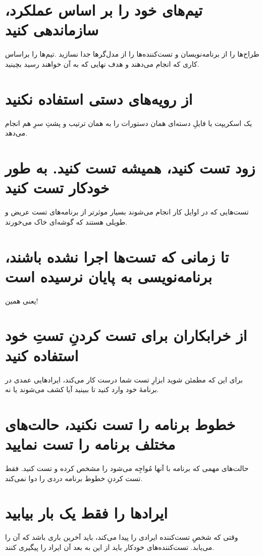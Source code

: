 \documentclass[10pt, a4paper]{book}
\begin{document}
    \section{تیم‌های خود را بر اساس عملکرد، سازماندهی کنید}
    طراح‌ها را از برنامه‌نویسان و تست‌کننده‌ها را از مدل‌گر‌ها جدا نسازید .تیم‌ها را براساس کاری که انجام می‌دهند و هدف نهایی که به آن خواهند رسید بچینید.

    \section{از رویه‌های دستی استفاده نکنید}
    یک اسکریپت یا فایلِ دسته‌ای همان دستورات را به همان ترتیب و پشتِ سرِ هم انجام می‌دهد.

    \section{زود تست کنید، همیشه تست کنید. به طور خودکار تست کنید}
    تست‌هایی که در اوایل کار انجام می‌شوند بسیار موثرتر از برنامه‌های تست عریض و طویلی هستند که گوشه‌ای خاک می‌خورند.

    \section{تا زمانی که تست‌ها اجرا نشده باشند، برنامه‌نویسی به پایان نرسیده است}
    یعنی همین!

    \section{از خرابکاران برای تست کردنِ تستِ خود استفاده کنید}
    برای این که مطمئن شوید ابزارِ تست شما درست کار می‌کند، ایرادهایی عمدی در برنامهٔ خود وارد کنید تا ببینید آیا کشف می‌شوند یا نه.
    
    \section{خطوط برنامه را تست نکنید، حالت‌های مختلف برنامه را تست نمایید}
    حالت‌های مهمی که برنامه با آنها مُواجِه می‌شود را مشخص کرده و تست کنید. فقط تست کردنِ خطوط برنامه دردی را دوا نمی‌کند.

    \section{ایرادها را فقط یک بار بیابید}
    وقتی که شخصِ تست‌کننده ایرادی را پیدا می‌کند، باید آخرین باری باشد که آن را می‌یابد. تست‌کننده‌های خودکار باید از این به بعد آن ایراد را پیگیری کنند.
\end{document}
